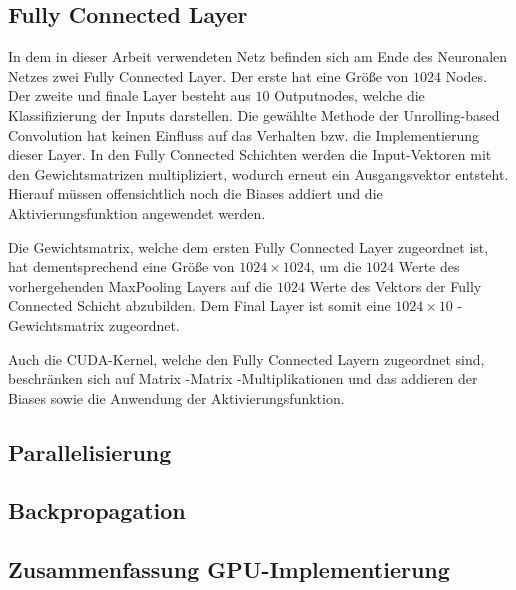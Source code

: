 \documentclass[../main.tex]{subfiles}
\begin{document}
\subsection{Fully Connected Layer} \label{sec:cuda_fully}
In dem in dieser Arbeit verwendeten Netz befinden sich am Ende des Neuronalen Netzes zwei Fully Connected Layer. Der erste hat eine Größe von $1024$ Nodes. Der zweite und finale Layer besteht aus $10$ Outputnodes, welche die Klassifizierung der Inputs darstellen. Die gewählte Methode der Unrolling-based Convolution hat keinen Einfluss auf das Verhalten bzw. die Implementierung dieser Layer. In den Fully Connected Schichten werden die Input-Vektoren mit den Gewichtsmatrizen multipliziert, wodurch erneut ein Ausgangsvektor entsteht. Hierauf müssen offensichtlich noch die Biases addiert und die Aktivierungsfunktion angewendet werden. \par Die Gewichtsmatrix, welche dem ersten Fully Connected Layer zugeordnet ist, hat dementsprechend eine Größe von $
1024\times1024$, um die $1024$ Werte des vorhergehenden MaxPooling Layers auf die $1024$ Werte des Vektors der Fully Connected Schicht abzubilden. Dem Final Layer ist somit eine $1024\times10$ -Gewichtsmatrix zugeordnet. \par 
Auch die CUDA-Kernel, welche den Fully Connected Layern zugeordnet sind, beschränken sich auf Matrix -Matrix -Multiplikationen und das addieren der Biases sowie die Anwendung der Aktivierungsfunktion. 
\subsection{Parallelisierung} \label{sec:cuda_parallelisierung}
\subsection{Backpropagation} \label{sec:cuda_back}
\subsection{Zusammenfassung GPU-Implementierung} \label{sec:cuda_zusammenfassung}
\end{document}
